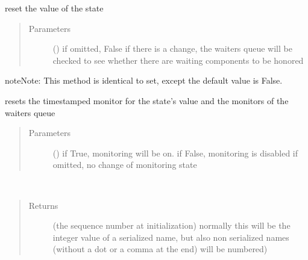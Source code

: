 \documentclass[letterpaper,10pt,english]{sphinxmanual}
\begin{document}
\begin{fulllineitems}
\begin{fulllineitems}
\label{\detokenize{Reference:salabim.State.reset}}
reset the value of the state
\begin{quote}\begin{description}
\item[{Parameters}] \leavevmode
{} (\sphinxstyleliteralemphasis{ (}\sphinxstyleliteralemphasis{)}) \textendash{} if omitted, False 
if there is a change, the waiters queue will be checked
to see whether there are waiting components to be honored

\end{description}\end{quote}

\begin{sphinxadmonition}{note}{Note:}
This method is identical to set, except the default value is False.
\end{sphinxadmonition}

\end{fulllineitems}


\begin{fulllineitems}
\label{\detokenize{Reference:salabim.State.reset_monitors}}
resets the timestamped monitor for the state’s value and the monitors of the waiters queue
\begin{quote}\begin{description}
\item[{Parameters}] \leavevmode
{} () \textendash{} if True, monitoring will be on. 
if False, monitoring is disabled 
if omitted, no change of monitoring state

\end{description}\end{quote}

\end{fulllineitems}


\begin{fulllineitems}
\label{\detokenize{Reference:salabim.State.sequence_number}}~\begin{quote}\begin{description}
\item[{Returns}] \leavevmode
{} \textendash{} (the sequence number at initialization) 
normally this will be the integer value of a serialized name,
but also non serialized names (without a dot or a comma at the end)
will be numbered)


\end{description}
\end{quote}
\end{fulllineitems}
\end{fulllineitems}
\end{document}
